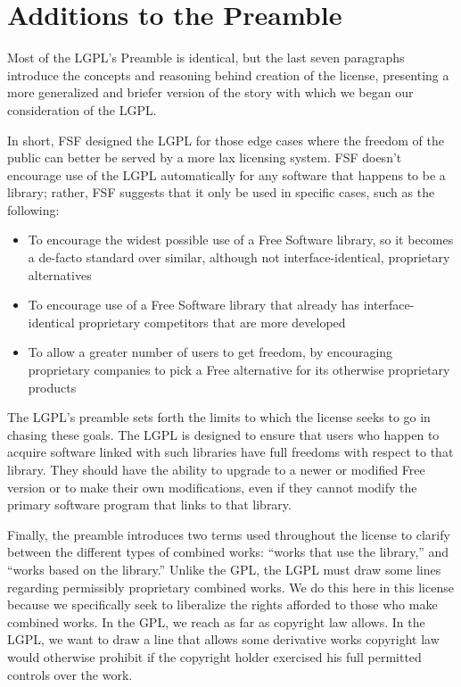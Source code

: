 \section{Additions to the Preamble}

Most of the LGPL's Preamble is identical, but the last seven paragraphs
introduce the concepts and reasoning behind creation of the license,
presenting a more generalized and briefer version of the story with which
we began our consideration of the LGPL\@.

In short, FSF designed the LGPL for those edge cases where the freedom of the
public can better be served by a more lax licensing system. FSF doesn't
encourage use of the LGPL automatically for any software that happens to be a
library; rather, FSF suggests that it only be used in specific cases, such
as the following:

\begin{itemize}

\item To encourage the widest possible use of a Free Software library, so
  it becomes a de-facto standard over similar, although not
  interface-identical, proprietary alternatives

\item To encourage use of a Free Software library that already has
  interface-identical proprietary competitors that are more developed

\item To allow a greater number of users to get freedom, by encouraging
  proprietary companies to pick a Free alternative for its otherwise
  proprietary products

\end{itemize}

The LGPL's preamble sets forth the limits to which the license seeks to go in
chasing these goals. The LGPL is designed to ensure that users who happen to
acquire software linked with such libraries have full freedoms with
respect to that library. They should have the ability to upgrade to a newer
or modified Free version or to make their own modifications, even if they
cannot modify the primary software program that links to that library.

Finally, the preamble introduces two terms used throughout the license to
clarify between the different types of combined works: ``works that use
the library,'' and ``works based on the library.''  Unlike the GPL, the LGPL must
draw some lines regarding permissibly proprietary combined works.  We do this here in this
license because we specifically seek to liberalize the rights afforded to
those who make combined works. In the GPL, we reach as far as copyright law
allows. In the LGPL, we want to draw a line that allows some derivative works
copyright law would otherwise prohibit if the copyright holder exercised
his full permitted controls over the work.

